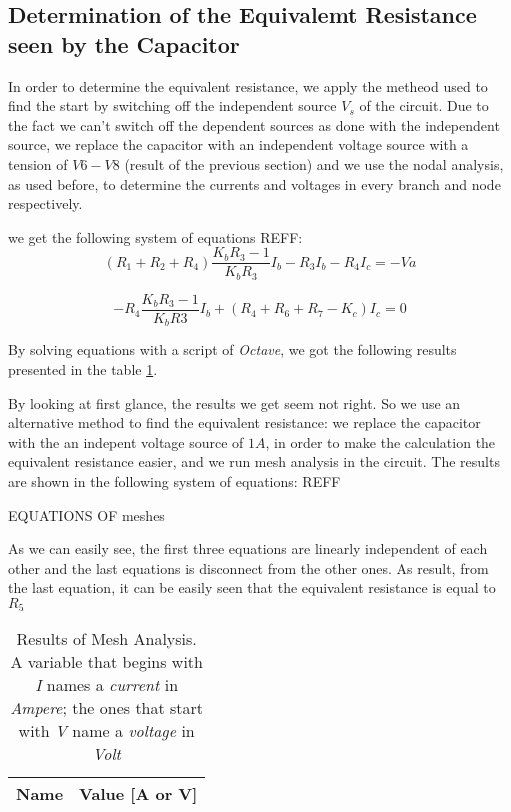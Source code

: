 \subsection{Determination of the Equivalemt Resistance seen by the Capacitor}

In order to determine the equivalent resistance, we apply the metheod used to find the start by switching off the independent source $V_s$ of the circuit. Due to the fact we can't switch off the dependent sources
as done with the independent source, we replace the capacitor with an independent voltage source with a tension of $V6-V8$ (result of the previous section) and we use the nodal analysis, as used before, to determine the currents and voltages in every branch and node respectively.

we get the following system of equations REFF:
\begin{equation}
  (R_1 + R_2 + R_4) \frac{K_b R_3 -1}{K_b R_3}I_b  - R_3I_b  - R_4I_c = -Va
  \label{mesh1}
\end{equation}

\begin{equation}
  -R_4 \frac{K_b R_3 - 1}{K_b R3}I_b + (R_4  + R_6 + R_7 - K_c)I_c = 0
  \label{mesh2}
\end{equation}



By solving equations with a script of \textit{Octave}, we got the following results presented in the table \ref{tab:op_mesh_tab}.

By looking at first glance, the results we get seem not right. So we use an alternative method to find the equivalent resistance: we replace the capacitor with the an indepent voltage source of $1 A$, in order to make the calculation the equivalent resistance easier,
and we run mesh analysis in the circuit. The results are shown in the following system of equations: REFF


EQUATIONS OF meshes



As we can easily see, the first three equations are linearly independent of each other and the last equations is disconnect from the other ones. As result, from the last equation, it can be easily seen that
the equivalent resistance is equal to $R_5$


\begin{table}[h]
  \centering
  \begin{tabular}{|l|r|}
    \hline
    {\bf Name} & {\bf Value [A or V]} \\ \hline
    
  \end{tabular}
  \caption{Results of Mesh Analysis. A variable that begins  with \textit{I} names a \textit{current} in \textit{Ampere}; the ones that start with \textit{V} name a \textit{voltage} in \textit{Volt}}
  \label{tab:op_mesh_tab}
\end{table}


